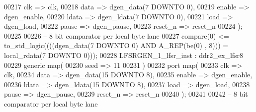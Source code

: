 \begin{DoxyCode}
00217             clk => clk,
00218             data => dgen_data\textcolor{vhdlchar}{(}\textcolor{vhdllogic}{7} \textcolor{keywordflow}{DOWNTO} \textcolor{vhdllogic}{0}\textcolor{vhdlchar}{)},
00219             enable => dgen_enable,
00220             ldata => dgen_ldata\textcolor{vhdlchar}{(}\textcolor{vhdllogic}{7} \textcolor{keywordflow}{DOWNTO} \textcolor{vhdllogic}{0}\textcolor{vhdlchar}{)},
00221             load => dgen_load,
00222             pause => dgen_pause,
00223             reset_n => reset_n
00224     \textcolor{vhdlchar}{)};
00225 
00226 \textcolor{keyword}{  -- 8 bit comparator per local byte lane}
00227   \textcolor{vhdlchar}{compare}\textcolor{vhdlchar}{(}\textcolor{vhdllogic}{}\textcolor{vhdllogic}{0}\textcolor{vhdlchar}{)} \textcolor{vhdlchar}{<=} \textcolor{vhdlchar}{to\_std\_logic}\textcolor{vhdlchar}{(}\textcolor{vhdlchar}{(}\textcolor{vhdlchar}{(}\textcolor{vhdlchar}{(}\textcolor{vhdlchar}{dgen_data}\textcolor{vhdlchar}{(}\textcolor{vhdllogic}{}\textcolor{vhdllogic}{7} \textcolor{keywordflow}{DOWNTO} \textcolor{vhdllogic}{}\textcolor{vhdllogic}{0}\textcolor{vhdlchar}{)} \textcolor{keywordflow}{AND} \textcolor{vhdlchar}{A\_REP}\textcolor{vhdlchar}{(}\textcolor{vhdlchar}{be}\textcolor{vhdlchar}{(}\textcolor{vhdllogic}{}\textcolor{vhdllogic}{0}\textcolor{vhdlchar}{)} \textcolor{vhdlchar}{,} \textcolor{vhdllogic}{}\textcolor{vhdllogic}{8}\textcolor{vhdlchar}{)}\textcolor{vhdlchar}{)}\textcolor{vhdlchar}{)} \textcolor{vhdlchar}{=} \textcolor{vhdlchar}{
      local_rdata}\textcolor{vhdlchar}{(}\textcolor{vhdllogic}{}\textcolor{vhdllogic}{7} \textcolor{keywordflow}{DOWNTO} \textcolor{vhdllogic}{}\textcolor{vhdllogic}{0}\textcolor{vhdlchar}{)}\textcolor{vhdlchar}{)}\textcolor{vhdlchar}{)};
00228   LFSRGEN\_1\_lfsr\_inst : ddr2_ex_lfsr8
00229     \textcolor{keywordflow}{generic} \textcolor{keywordflow}{map}(
00230       seed => \textcolor{vhdllogic}{11}
00231     \textcolor{vhdlchar}{)}
00232     \textcolor{keywordflow}{port} \textcolor{keywordflow}{map}(
00233             clk => clk,
00234             data => dgen_data\textcolor{vhdlchar}{(}\textcolor{vhdllogic}{15} \textcolor{keywordflow}{DOWNTO} \textcolor{vhdllogic}{8}\textcolor{vhdlchar}{)},
00235             enable => dgen_enable,
00236             ldata => dgen_ldata\textcolor{vhdlchar}{(}\textcolor{vhdllogic}{15} \textcolor{keywordflow}{DOWNTO} \textcolor{vhdllogic}{8}\textcolor{vhdlchar}{)},
00237             load => dgen_load,
00238             pause => dgen_pause,
00239             reset_n => reset_n
00240     \textcolor{vhdlchar}{)};
00241 
00242 \textcolor{keyword}{  -- 8 bit comparator per local byte lane}

\end{DoxyCode}
